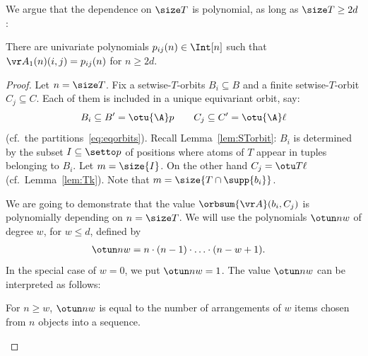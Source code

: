 \smallskip

We argue that the dependence on $\size T$ is polynomial, as long as $\size T\geq 2d$:
%
\begin{lemma} \label{lem:poly}
There are univariate polynomials $p_{ij}(n) \in \Int[n]$ 
such that
$\vr A_1(n)(i,j) = p_{ij}(n)$ for $n \geq 2d$.
\end{lemma}
%
%
\begin{proof} 
Let $n=\size T$.
Fix a setwise-$T$-orbits $B_i\subseteq B$ and a finite setwise-$T$-orbit $C_j\subseteq C$.
Each of them is included in a unique equivariant orbit, say:
\[
B_i \subseteq B' =  \otu {\A} p \qquad
C_j \subseteq C' = \otu {\A} \ell
\] 
(cf.~the partitions~\eqref{eq:eqorbits}).
Recall Lemma~\ref{lem:STorbit}:  $B_i$ is determined by the subset 
$I \subseteq \setto p$ of positions where atoms of $T$ appear in tuples belonging to $B_i$.
Let $m = \size{I}$.
On the other hand $C_j = \otu T \ell$ (cf.~Lemma~\ref{lem:Tk}).
%
%
%
Note that $m = \size{T\cap \supp{b_i}}$.

\smallskip

We are going to demonstrate that the value $\orbsum{\vr A}(b_i, C_j)$ is
polynomially depending on $n=\size T$.
We will use the polynomials 
$\otun n w$
of degree $w$, for $w\leq d$, defined by 
\begin{align} \label{eq:poly2}
\begin{aligned}
\otun n w & = n \cdot (n-1) \cdot \ldots \cdot (n-w+1).
\end{aligned}
\end{align}
In the special case of $w=0$, we put $\otun n w = 1$.
The value $\otun n w$ can be interpreted as follows:
%
\begin{claim} \label{claim:polyint}
For $n\geq w$, $\otun n w$ is equal to the number of 
arrangements of $w$ items chosen from  $n$ objects into a sequence.
\end{claim}


\end{proof}
